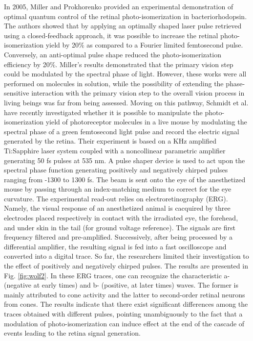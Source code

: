 \documentclass[journal=jacsat,manuscript=article]{achemso}
\begin{document}
In 2005, Miller and Prokhorenko provided an experimental demonstration
of optimal quantum control of the retinal photo-isomerization in
bacteriorhodopsin.\cite{miller:2005} The authors showed that by
applying an optimally shaped laser pulse retrieved using a
closed-feedback approach, it was possible to increase the retinal
photo-isomerization yield by 20\% as compared to a Fourier limited
femtosecond pulse. Conversely, an anti-optimal pulse shape reduced the
photo-isomerization efficiency by 20\%. Miller’s results demonstrated
that the primary vision step could be modulated by the spectral phase
of light. However, these works were all performed on molecules in
solution, while the possibility of extending the phase-sensitive
interaction with the primary vision step to the overall vision process
in living beings was far from being assessed.  Moving on this pathway,
Schmidt et al. have recently investigated whether it is possible to
manipulate the photo-isomerization yield of photoreceptor molecules in
a live mouse by modulating the spectral phase of a green femtosecond
light pulse and record the electric signal generated by the
retina. Their experiment is based on a KHz amplified Ti:Sapphire laser
system coupled with a noncollinear parametric amplifier generating 50
fs pulses at 535 nm. A pulse shaper device is used to act upon the
spectral phase function generating positively and negatively chirped
pulses ranging from -1300 to 1300 fs. The beam is sent onto the eye of
the anesthetized mouse by passing through an index-matching medium to
correct for the eye curvature. The experimental read-out relies on
electroretinography (ERG). Namely, the visual response of an
anesthetized animal is cacquired by three electrodes placed
respectively in contact with the irradiated eye, the forehead, and
under skin in the tail (for ground voltage reference). The signals are
first frequency filtered and pre-amplified. Successively, after being
processed by a differential amplifier, the resulting signal is fed
into a fast oscilloscope and converted into a digital trace. So far,
the researchers limited their investigation to the effect of
positively and negatively chirped pulses. The results are presented in
Fig. \ref{fig:wolf2}. In these ERG traces, one can recognize the
characteristic a- (negative at early times) and b- (positive, at later
times) waves. The former is mainly attributed to cone activity and the
latter to second-order retinal neurons from cones. The results
indicate that there exist significant differences among the traces
obtained with different pulses, pointing unambiguously to the fact
that a modulation of photo-isomerization can induce effect at the end
of the cascade of events leading to the retina signal generation.
\end{document}
